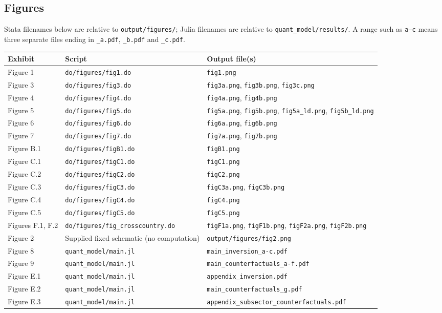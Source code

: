 \documentclass[11pt]{article}
\newcommand{\pkgfile}[1]{\nolinkurl{#1}}
\begin{document}
\subsection*{Figures}

Stata filenames below are relative to \pkgfile{output/figures/}; Julia
filenames are relative to \pkgfile{quant_model/results/}. A range such as
\texttt{a--c} means three separate files ending in \texttt{\_a.pdf},
\texttt{\_b.pdf} and \texttt{\_c.pdf}.

\begin{longtable}{@{}>{\raggedright\arraybackslash}p{2.4cm}>{\raggedright\arraybackslash}p{5.0cm}>{\raggedright\arraybackslash}p{7.3cm}@{}}
\toprule
\textbf{Exhibit} & \textbf{Script} & \textbf{Output file(s)}\\
\midrule
\endhead
Figure 1 & \pkgfile{do/figures/fig1.do} & \pkgfile{fig1.png}\\
Figure 3 & \pkgfile{do/figures/fig3.do} & \pkgfile{fig3a.png}, \pkgfile{fig3b.png}, \pkgfile{fig3c.png}\\
Figure 4 & \pkgfile{do/figures/fig4.do} & \pkgfile{fig4a.png}, \pkgfile{fig4b.png}\\
Figure 5 & \pkgfile{do/figures/fig5.do} & \pkgfile{fig5a.png}, \pkgfile{fig5b.png}, \pkgfile{fig5a_ld.png}, \pkgfile{fig5b_ld.png}\\
Figure 6 & \pkgfile{do/figures/fig6.do} & \pkgfile{fig6a.png}, \pkgfile{fig6b.png}\\
Figure 7 & \pkgfile{do/figures/fig7.do} & \pkgfile{fig7a.png}, \pkgfile{fig7b.png}\\
Figure B.1 & \pkgfile{do/figures/figB1.do} & \pkgfile{figB1.png}\\
Figure C.1 & \pkgfile{do/figures/figC1.do} & \pkgfile{figC1.png}\\
Figure C.2 & \pkgfile{do/figures/figC2.do} & \pkgfile{figC2.png}\\
Figure C.3 & \pkgfile{do/figures/figC3.do} & \pkgfile{figC3a.png}, \pkgfile{figC3b.png}\\
Figure C.4 & \pkgfile{do/figures/figC4.do} & \pkgfile{figC4.png}\\
Figure C.5 & \pkgfile{do/figures/figC5.do} & \pkgfile{figC5.png}\\
Figures F.1, F.2 & \pkgfile{do/figures/fig_crosscountry.do} & \pkgfile{figF1a.png}, \pkgfile{figF1b.png}, \pkgfile{figF2a.png}, \pkgfile{figF2b.png}\\
\addlinespace
Figure 2 & Supplied fixed schematic (no computation) & \pkgfile{output/figures/fig2.png}\\
Figure 8 & \pkgfile{quant_model/main.jl} & \pkgfile{main_inversion_a-c.pdf}\\
Figure 9 & \pkgfile{quant_model/main.jl} & \pkgfile{main_counterfactuals_a-f.pdf}\\
Figure E.1 & \pkgfile{quant_model/main.jl} & \pkgfile{appendix_inversion.pdf}\\
Figure E.2 & \pkgfile{quant_model/main.jl} & \pkgfile{main_counterfactuals_g.pdf}\\
Figure E.3 & \pkgfile{quant_model/main.jl} & \pkgfile{appendix_subsector_counterfactuals.pdf}\\
\bottomrule
\end{longtable}
\end{document}
